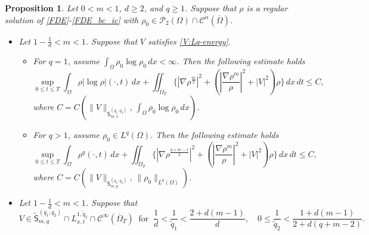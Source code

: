 \documentclass{amsart}
\newtheorem{proposition}[defn]{Proposition}
\numberwithin{equation}{section}
\newcommand{\calC}{{ \mathcal C  }}
\newcommand{\abs}[1]{\left| #1 \right|}
\begin{document}
\begin{proposition}\label{P:Energy-speed} 
Let $0<m<1$, $d\geq 2$, and $q\geq 1$. Suppose that $\rho$ is a regular solution of \eqref{FDE}-\eqref{FDE_bc_ic} with $\rho_{0}\in  \mathcal{P}_2(\Omega) \cap \calC^{\alpha}(\overline{\Omega})$. 

\begin{itemize}

\item[(i)] Let $1-\frac{1}{d} < m < 1$. Suppose that $V$ satisfies \eqref{V:Lq-energy}.
\begin{itemize}
	\item[$\bullet$] For $q=1$, assume $\int_{\Omega} \rho_0 \log \rho_0 \,dx < \infty$. 
Then the following estimate holds
\begin{equation}\label{L1-energy-speed}
\sup_{0\leq t \leq T} \int_{\Omega} \rho \abs{\log \rho} (\cdot, t)  \,dx
+ \iint_{\Omega_T} \{ \abs{\nabla \rho^{\frac m2}}^2 + \left(\abs{\frac{\nabla
\rho^m}{\rho}}^{2}+|V|^{2}\right ) \rho  \}\,dx\,dt
 \leq  C,
\end{equation}
where $C=C (\|V\|_{\mathsf{S}_{m,1}^{(q_1, q_2)}}, \, \int_{\Omega} \rho_0 \log \rho_0 \,dx )$.

\item[$\bullet$] For $q>1$, assume $\rho_0 \in L^{q}(\Omega)$.
Then the following estimate holds%
 \begin{equation}\label{Lq-energy-speed}
 \sup_{0\leq t \leq T}  \int_{\Omega} \rho^q(\cdot, t) \,dx
 + \iint_{\Omega_T} \{ \abs{\nabla \rho^{\frac{q+m-1}{2}}}^2  + \left(\abs{\frac{\nabla
\rho^m}{\rho}}^{2}+|V|^{2}\right ) \rho  \}\,dx\,dt
\leq C,
\end{equation}
where $C=C (\|V\|_{\mathsf{S}_{m,q}^{(q_1, q_2)}}, \, \|\rho_0 \|_{L^{q}(\Omega)})$.
\end{itemize}



\item[(ii)] Let $ 1-\frac{1}{d} < m<1$. Suppose that 
\begin{equation}\label{Vq:tilde:energy-speed}
V\in \tilde{\mathsf{S}}_{m,q}^{(q_1, q_2)}\cap L_{x,t}^{1,\tilde{q}_2} \cap \calC^\infty(\overline{\Omega}_T) \ \text{ for } \
\frac{1}{d} < \frac{1}{\tilde{q}_1} < \frac{2 + d(m-1)}{d}, \quad 0 \leq \frac{1}{\tilde{q}_2} < \frac{1+d(m-1)}{2+d(q+m-2)}. 
\end{equation}


\end{itemize}
\end{proposition}
\end{document}
